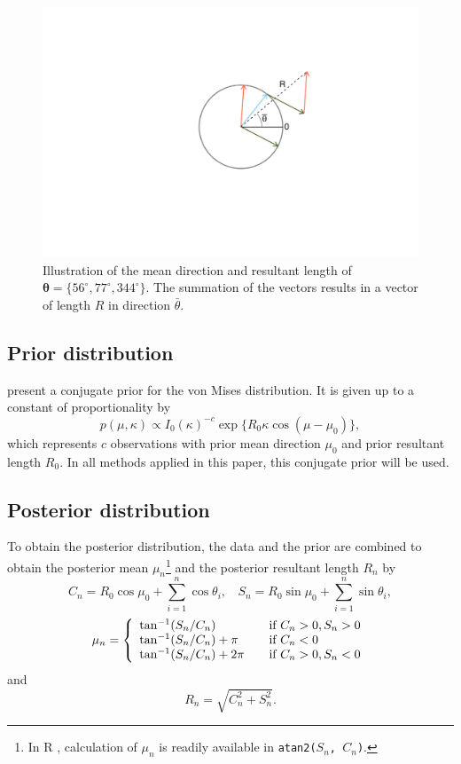 \documentclass[bib]{ba/ba}
\begin{document}
\begin{figure}
\centering
\includegraphics[width=0.7\linewidth, clip, trim=4cm 3cm 3cm 2cm]{ExampleRMu.pdf}
\caption{Illustration of the mean direction and resultant length of  $\boldsymbol\theta=\{56^\circ, 77^\circ, 344^\circ\}$. The summation of the vectors results in a vector of length $R$ in direction $\bar{\theta}$.}
\label{exampleRMu}
\end{figure}


\subsection{Prior distribution} \label{prior}

\citet{guttorp1988finding} present a conjugate prior for the von Mises distribution. It is given up to a constant of proportionality by 
$$ p(\mu, \kappa) \propto  I_0 (\kappa) ^{-c} \exp\{R_0 \kappa \cos (\mu - \mu_0)\}  ,$$
which represents $c$ observations with prior mean direction $\mu_0$ and prior resultant length $R_0$. In all methods applied in this paper, this conjugate prior will be used. 

\subsection{Posterior distribution} \label{posterior}
To obtain the posterior distribution, the data and the prior are combined to obtain the posterior mean $\mu_n$\footnote{In  R \citep{team2013r}, calculation of $\mu_n$ is readily available in \texttt{atan2($S_n$, $C_n$)}.} and the posterior resultant length $R_n$ by
$$ C_n = R_0 \cos \mu_0 + \sum_{i=1}^n \cos \theta_i, ~~~~ S_n = R_0 \sin \mu_0 + \sum_{i=1}^n \sin \theta_i,$$
$$  \mu_n = \left\{ 
  \begin{array}{l l}
   \tan^{-1} (S_n/C_n)        & \quad \textnormal{if}~ \text{$C_n > 0, S_n > 0$}\\
   \tan^{-1} (S_n/C_n) + \pi  & \quad \textnormal{if}~ \text{$C_n < 0$}\\ 
   \tan^{-1} (S_n/C_n) + 2\pi & \quad \textnormal{if}~ \text{$C_n > 0, S_n < 0$}
  \end{array} \right.$$
and
$$ R_n = \sqrt{C_n^2 + S_n^2}.$$
\end{document}
